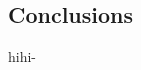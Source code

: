 \documentclass{article}
\begin{document}
\begin{multicols}{2}
\section{Conclusions}
hihi-\cite{RTIEBT}






\end{multicols}
\end{document}
